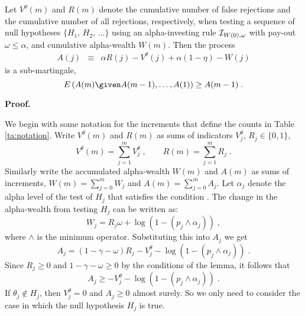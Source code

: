 \documentclass[12pt]{article}
\begin{document}
\begin{lemma} \label{le:martingale} Let $V^\theta(m)$ and $R(m)$
 denote the cumulative number of false rejections and the cumulative
 number of all rejections, respectively, when testing a sequence of
 null hypotheses $\{H_1,\,H_2,\,\ldots\}$ using an alpha-investing
 rule ${\cal I}_{W(0),\omega}$ with pay-out $\omega \le \alpha$, and
 cumulative alpha-wealth $W(m)$.  Then the process
\begin{eqnarray*}
    A(j) 
  &\equiv& \alpha R(j) - V^\theta(j) + \alpha(1 - \eta)  - W(j) 
\end{eqnarray*}
is a sub-martingale,
\begin{equation}
   E \left(A(m) \given A(m-1), \ldots, A(1)\right) \ge A(m-1) \;.
 \label{eq:super}
\end{equation}
\end{lemma}

\noindent 
{\bf Proof.} 

We begin with some notation for the increments that define the counts
in Table \ref{ta:notation}.  Write $V^\theta(m)$ and $R(m)$ as sums of
indicators $V^\theta_j,\, R_j \in \{0,1\}$,
\begin{displaymath}
   V^\theta(m) = \sum_{j=1}^m V^\theta_j \;, \qquad
   R(m) = \sum_{j=1}^m R_j \;.
\label{eq:sums}
\end{displaymath}
Similarly write the accumulated alpha-wealth $W(m)$ and $A(m)$ as sums of
increments, $W(m) = \sum_{j=0}^m W_j$ and $A(m) = \sum_{j=0}^m A_j$.
Let $\alpha_j$ denote the alpha level of the test of $H_j$ that satisfies
the condition .  The change in the alpha-wealth from
testing $H_j$ can be written as:
\begin{displaymath}
  W_j  =  R_j \omega + \log(1 - (p_j \wedge \alpha_j))  \;,
\end{displaymath}
where $\wedge$ is the minimum operator.  Substituting this into $A_j$ we get
\begin{displaymath}
   A_j  =  (1 -\gamma -\omega) R_j - V^\theta_j  - \log(1 - (p_j \wedge
\alpha_j))  \;.
\end{displaymath}
Since $R_j \ge 0$ and $1-\gamma - \omega \ge 0$ by the conditions of the
lemma, it follows that
\begin{equation}
\label{eq:a:bound}
A_j  \ge   - V^\theta_j  - \log(1 - (p_j \wedge \alpha_j))  \;.
\end{equation}
If $\theta_j \not\in H_j$, then $V^\theta_j = 0$ and $A_j \ge 0$
almost surely.  So we only need to consider the case in which the null
hypothesis $H_j$ is true.
\end{document}
